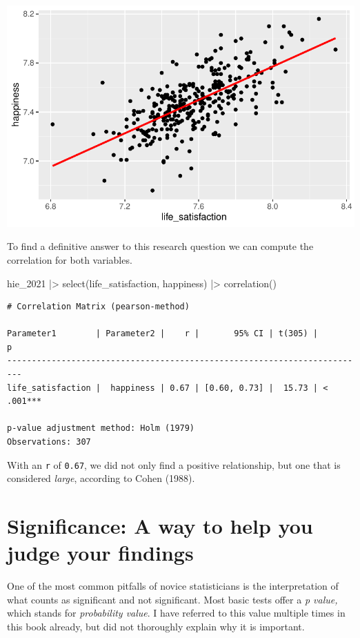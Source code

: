 \documentclass[
  letterpaper,
  DIV=11,
  numbers=noendperiod]{scrreprt}
\newenvironment{Shaded}{\begin{snugshade}}{\end{snugshade}}
\newcommand{\FunctionTok}[1]{\textcolor[rgb]{0.28,0.35,0.67}{#1}}
\newcommand{\NormalTok}[1]{\textcolor[rgb]{0.00,0.23,0.31}{#1}}
\newcommand{\SpecialCharTok}[1]{\textcolor[rgb]{0.37,0.37,0.37}{#1}}
\begin{document}
\includegraphics{10_correlations_files/figure-latex/happiness-vs-life-satisfaction-regression-line-1.pdf}

To find a definitive answer to this research question we can compute the
correlation for both variables.

\begin{Shaded}
\begin{Highlighting}[]
\NormalTok{hie\_2021 }\SpecialCharTok{|\textgreater{}}
  \FunctionTok{select}\NormalTok{(life\_satisfaction, happiness) }\SpecialCharTok{|\textgreater{}}
  \FunctionTok{correlation}\NormalTok{()}
\end{Highlighting}
\end{Shaded}

\begin{verbatim}
# Correlation Matrix (pearson-method)

Parameter1        | Parameter2 |    r |       95% CI | t(305) |         p
-------------------------------------------------------------------------
life_satisfaction |  happiness | 0.67 | [0.60, 0.73] |  15.73 | < .001***

p-value adjustment method: Holm (1979)
Observations: 307
\end{verbatim}

With an \texttt{r} of \texttt{0.67}, we did not only find a positive
relationship, but one that is considered \emph{large}, according to
Cohen (1988).

\section{Significance: A way to help you judge your
findings}\label{sec-significance}

One of the most common pitfalls of novice statisticians is the
interpretation of what counts as significant and not significant. Most
basic tests offer a \emph{p value,} which stands for \emph{probability
value}. I have referred to this value multiple times in this book
already, but did not thoroughly explain why it is important.
\end{document}
